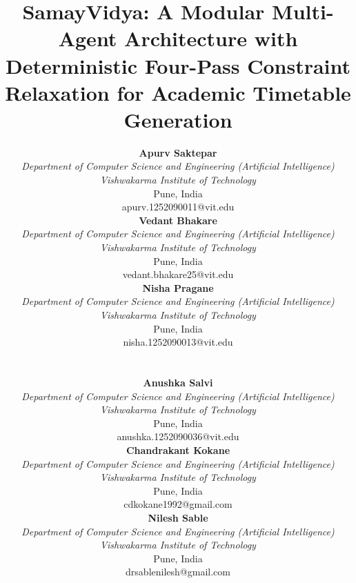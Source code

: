 \documentclass[conference]{IEEEtran}
\begin{document}
\title{SamayVidya: A Modular Multi-Agent Architecture with Deterministic Four-Pass Constraint Relaxation for Academic Timetable Generation\\}

\author{
\noindent
\begin{minipage}[t]{0.32\textwidth}
\centering
\textbf{Apurv Saktepar}\\
\textit{Department of Computer Science and Engineering (Artificial Intelligence)}\\
\textit{Vishwakarma Institute of Technology}\\
Pune, India\\
apurv.1252090011@vit.edu
\end{minipage}
\hfill
\begin{minipage}[t]{0.32\textwidth}
\centering
\textbf{Vedant Bhakare}\\
\textit{Department of Computer Science and Engineering (Artificial Intelligence)}\\
\textit{Vishwakarma Institute of Technology}\\
Pune, India\\
vedant.bhakare25@vit.edu
\end{minipage}
\hfill
\begin{minipage}[t]{0.32\textwidth}
\centering
\textbf{Nisha Pragane}\\
\textit{Department of Computer Science and Engineering (Artificial Intelligence)}\\
\textit{Vishwakarma Institute of Technology}\\
Pune, India\\
nisha.1252090013@vit.edu
\end{minipage}
\\[1.0em]
\noindent
\begin{minipage}[t]{0.32\textwidth}
\centering
\textbf{Anushka Salvi}\\
\textit{Department of Computer Science and Engineering (Artificial Intelligence)}\\
\textit{Vishwakarma Institute of Technology}\\
Pune, India\\
anushka.1252090036@vit.edu
\end{minipage}
\hfill
\begin{minipage}[t]{0.32\textwidth}
\centering
\textbf{Chandrakant Kokane}\\
\textit{Department of Computer Science and Engineering (Artificial Intelligence)}\\
\textit{Vishwakarma Institute of Technology}\\
Pune, India\\
cdkokane1992@gmail.com
\end{minipage}
\hfill
\begin{minipage}[t]{0.32\textwidth}
\centering
\textbf{Nilesh Sable}\\
\textit{Department of Computer Science and Engineering (Artificial Intelligence)}\\
\textit{Vishwakarma Institute of Technology}\\
Pune, India\\
drsablenilesh@gmail.com
\end{minipage}
}
\end{document}
